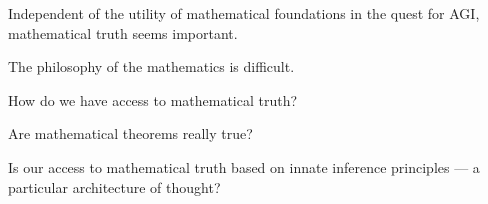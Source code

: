 {\vfill
\centerline{
}


Independent of the utility of mathematical foundations in the quest for AGI, mathematical truth seems important.

\vfill
The philosophy of the mathematics is difficult.

\vfill
How do we have access to mathematical truth?

\vfill
Are mathematical theorems really true?

\vfill
Is our access to mathematical truth based on innate inference principles --- a particular architecture of thought?



}

